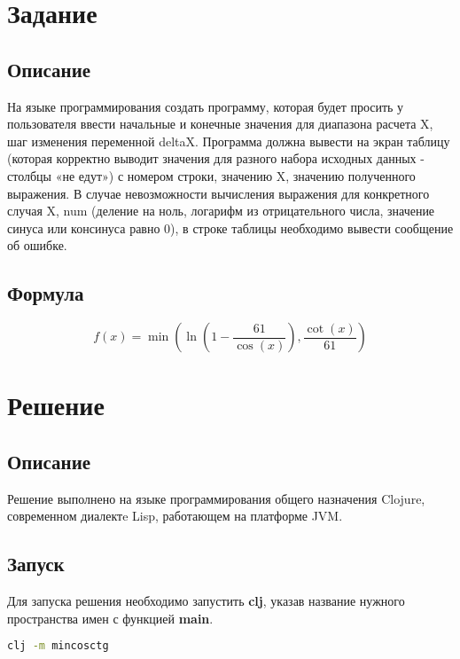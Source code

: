 \documentclass[a4paper,12pt,russian]{report}
\begin{document}


\newpage
\tableofcontents
\clearpage
{}

\section{Задание}

\subsection{Описание}
На языке программирования создать программу, которая будет просить у пользователя ввести начальные и конечные значения для диапазона расчета X, шаг изменения переменной deltaX. Программа должна вывести на экран таблицу (которая корректно выводит значения для разного набора исходных данных - столбцы «не едут») с номером строки, значению X, значению полученного выражения. В случае невозможности вычисления выражения для конкретного случая X, num (деление на ноль, логарифм из отрицательного числа, значение синуса или консинуса равно 0), в строке таблицы необходимо вывести сообщение об ошибке.

\subsection{Формула}
\begin{equation*}
  f(x) = \min\left(\ln\left(1-\frac{61}{\cos(x)}\right), \frac{\cot(x)}{61}\right)
\end{equation*}
\clearpage

\section{Решение}

\subsection{Описание}
Решение выполнено на языке программирования общего назначения Clojure, современном диалектe Lisp, работающем на платформе JVM.

\subsection{Запуск}
Для запуска решения необходимо запустить \textbf{clj}, указав название нужного пространства имен с функцией \textbf{main}.
\begin{lstlisting}[language=bash]
clj -m mincosctg
\end{lstlisting}
\end{document}
